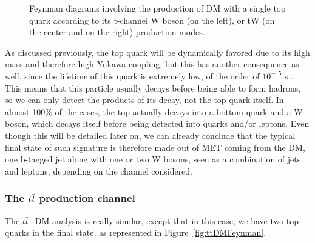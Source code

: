 \documentclass[a4paper, 10pt, openright]{report}
\begin{document}
\begin{figure}[htbp]
\begin{minipage}{.31\textwidth}
{
}
\end{minipage} \hfill
\caption{Feynman diagrams involving the production of \ac{DM} with a single top quark according to its t-channel W boson (on the left), or tW (on the center and on the right) production modes.}
\label{fig:singleTopFeynman}
\end{figure}

As discussed previously, the top quark will be dynamically favored due to its high mass and therefore high Yukawa coupling, but this has another consequence as well, since the lifetime of this quark is extremely low, of the order of $10^{-15}$ s \cite{PDG}. This means that this particle usually decays before being able to form hadrons, so we can only detect the products of its decay, not the top quark itself. In almost 100\% of the cases, the top actually decays into a bottom quark and a W boson, which decays itself before being detected into quarks and/or leptons. Even though this will be detailed later on, we can already conclude that the typical final state of such signature is therefore made out of \ac{MET} coming from the \ac{DM}, one b-tagged jet along with one or two W bosons, seen as a combination of jets and leptons, depending on the channel considered.

\subsubsection{The $t \bar t$ production channel} \label{subsection:ttChannel}

The $t \bar t$+DM analysis is really similar, except that in this case, we have two top quarks in the final state, as represented in Figure~\ref{fig:ttDMFeynman}.

\end{document}
